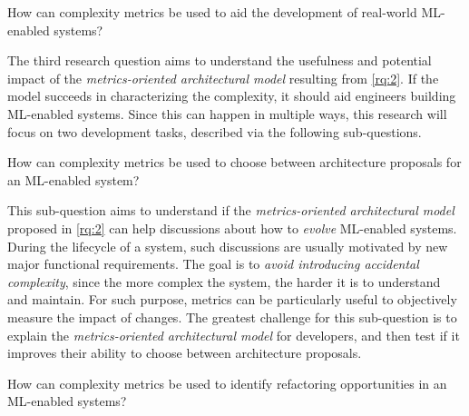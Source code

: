     

    \begin{researchquestion}
      How can complexity metrics be used to aid the development of
      real-world ML-enabled systems?
    \end{researchquestion}

    The third research question aims to understand the usefulness and
    potential impact of the \emph{metrics-oriented architectural model}
    resulting from \cref{rq:2}. If the model succeeds in characterizing
    the complexity, it should aid engineers building ML-enabled systems.
    Since this can happen in multiple ways, this research will focus on
    two development tasks, described via the following sub-questions.
    
    \begin{subresearchquestion}
      How can complexity metrics be used to choose between architecture
      proposals for an ML-enabled system?
    \end{subresearchquestion}

    This sub-question aims to understand if the \emph{metrics-oriented
    architectural model} proposed in \cref{rq:2} can help discussions
    about how to \emph{evolve} ML-enabled systems. During the lifecycle of a
    system, such discussions are usually motivated by new major functional
    requirements. The goal is to \emph{avoid introducing accidental complexity},
    since the more complex the system, the harder it is to understand
    and maintain. For such purpose, metrics can be particularly useful
    to objectively measure the impact of changes. The greatest challenge
    for this sub-question is to explain the \emph{metrics-oriented
    architectural model} for developers, and then test if it improves
    their ability to choose between architecture proposals.

    \begin{subresearchquestion}
      How can complexity metrics be used to identify refactoring
      opportunities in an ML-enabled systems?
    \end{subresearchquestion}

